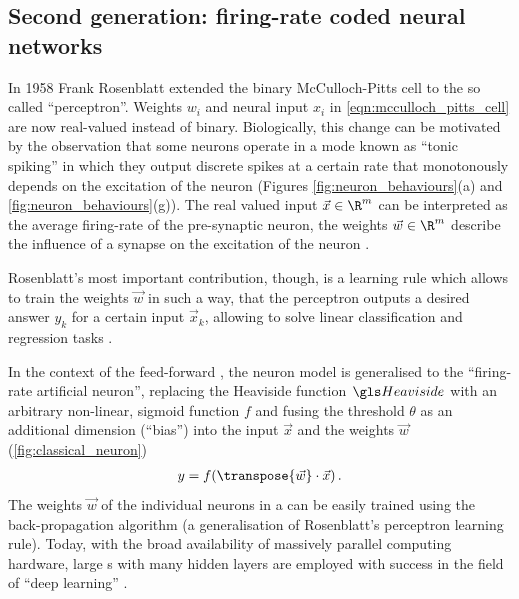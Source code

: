 \subsection{Second generation: firing-rate coded neural networks}

In 1958 Frank Rosenblatt extended the binary McCulloch-Pitts cell to the so called \enquote{perceptron}. Weights $w_i$ and neural input $x_i$ in \cref{eqn:mcculloch_pitts_cell} are now real-valued instead of binary. Biologically, this change can be motivated by the observation that some neurons operate in a mode known as \enquote{tonic spiking} in which they output discrete spikes at a certain rate that monotonously depends on the excitation of the neuron (Figures \ref{fig:neuron_behaviours}(a) and \ref{fig:neuron_behaviours}(g)). The real valued input $\vec x \in \R^m$ can be interpreted as the average firing-rate of the pre-synaptic neuron, the weights $\vec w \in \R^m$ describe the influence of a synapse on the excitation of the neuron \cite{haykin2011neural}.

Rosenblatt's most important contribution, though, is a learning rule which allows to train the weights $\vec w$ in such a way, that the perceptron outputs a desired answer $y_k$ for a certain input $\vec x_k$, allowing to solve linear classification and regression tasks \cite{minsky1987perceptrons}.

In the context of the feed-forward \MLP, the neuron model is generalised to the \enquote{firing-rate artificial neuron}, replacing the Heaviside function $\Heaviside$ with an arbitrary non-linear, sigmoid function $f$ and fusing the threshold $\theta$ as an additional dimension (\enquote{bias}) into the input $\vec x$ and the weights $\vec w$ (\cref{fig:classical_neuron})
\begin{align}
	y = f(\transpose{\vec w} \cdot \vec x) \,.
\end{align}
The weights $\vec w$ of the individual neurons in a \MLP can be easily trained using the back-propagation algorithm (a generalisation of Rosenblatt's perceptron learning rule). Today, with the broad availability of massively parallel computing hardware, large {\MLP}s with many hidden layers are employed with success in the field of \enquote{deep learning} \cite{hinton2006fast}.

